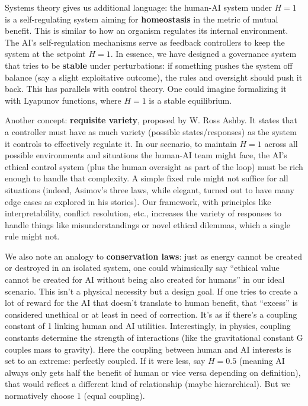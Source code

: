 \documentclass[12pt]{article}
\begin{document}
Systems theory gives us additional language: the human-AI system under $H=1$ is a self-regulating system aiming for \textbf{homeostasis} in the metric of mutual benefit. This is similar to how an organism regulates its internal environment. The AI’s self-regulation mechanisms serve as feedback controllers to keep the system at the setpoint $H=1$. In essence, we have designed a governance system that tries to be \textbf{stable} under perturbations: if something pushes the system off balance (say a slight exploitative outcome), the rules and oversight should push it back. This has parallels with control theory. One could imagine formalizing it with Lyapunov functions, where $H=1$ is a stable equilibrium.

Another concept: \textbf{requisite variety}, proposed by W. Ross Ashby. It states that a controller must have as much variety (possible states/responses) as the system it controls to effectively regulate it. In our scenario, to maintain $H=1$ across all possible environments and situations the human-AI team might face, the AI’s ethical control system (plus the human oversight as part of the loop) must be rich enough to handle that complexity. A simple fixed rule might not suffice for all situations (indeed, Asimov’s three laws, while elegant, turned out to have many edge cases as explored in his stories). Our framework, with principles like interpretability, conflict resolution, etc., increases the variety of responses to handle things like misunderstandings or novel ethical dilemmas, which a single rule might not.

We also note an analogy to \textbf{conservation laws}: just as energy cannot be created or destroyed in an isolated system, one could whimsically say “ethical value cannot be created for AI without being also created for humans” in our ideal scenario. This isn’t a physical necessity but a design goal. If one tries to create a lot of reward for the AI that doesn’t translate to human benefit, that “excess” is considered unethical or at least in need of correction. It’s as if there’s a coupling constant of 1 linking human and AI utilities. Interestingly, in physics, coupling constants determine the strength of interactions (like the gravitational constant G couples mass to gravity). Here the coupling between human and AI interests is set to an extreme: perfectly coupled. If it were less, say $H=0.5$ (meaning AI always only gets half the benefit of human or vice versa depending on definition), that would reflect a different kind of relationship (maybe hierarchical). But we normatively choose 1 (equal coupling).
\end{document}

